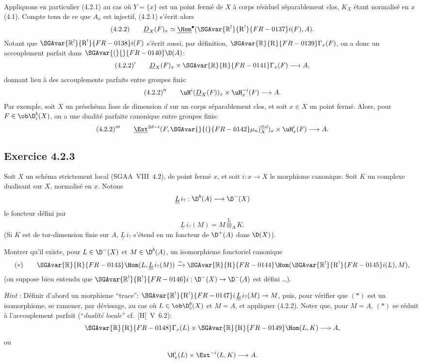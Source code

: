 Appliquons en particulier (4.2.1) au cas où $Y=\{x\}$ est un point fermé de $X$ à corps résiduel séparablement clos, $K_X$ étant normalisé en $x$ (4.1). Compte tenu de ce que $A_x$ est injectif, (4.2.1) s'écrit alors
\[
(4.2.2)\qquad \underline{D}_X(F)_x\simeq\underline{\Hom}^{\bullet}(\SGAvar{\mathbb{R}^{!}}{\mathrm{R}^{!}}{FR-0137}i(F),A).
\]
Notant que $\SGAvar{\mathbb{R}^{!}}{\mathrm{R}^{!}}{FR-0138}i(F)$ s'écrit aussi, par définition, $\SGAvar{\mathbb{R}}{\mathrm{R}}{FR-0139}\Gamma_x(F)$, on a donc un accouplement parfait dans $\SGAvar{(}{}{FR-0140}\D(A)$:
\[
(4.2.2)'\qquad \underline{D}_X(F)_x\times \SGAvar{\mathbb{R}}{\mathrm{R}}{FR-0141}\Gamma_x(F)\longrightarrow A,
\]
donnant lieu à des accouplements parfaits entre groupes finis:
\[
(4.2.2)''\qquad \uH^i(\underline{D}_X(F))_x\times \uH_x^{-i}(F)\longrightarrow A.
\]
Par exemple, soit $X$ un préschéma lisse de dimension $d$ sur un corps séparablement clos, et soit $x\in X$ un point fermé. Alors, pour $F\in\ob\D_c^b(X)$, on a une dualité parfaite canonique entre groupes finis:
\[
(4.2.2)'''\qquad \underline{\Ext}^{2d-i}(F,\SGAvar{}{(}{FR-0142}\mu_n)_X^{\otimes d})_x\times \uH_x^i(F)\longrightarrow A.
\]

\subsection*{Exercice 4.2.3}
Soit $X$ un schéma strictement local (SGAA~VIII~4.2), de point fermé $x$, et soit $i:x\to X$ le morphisme canonique. Soit $K$ un complexe dualisant sur $X$, normalisé en $x$. Notons
\[
\underline{\underline{L}}\, i_? : \D^b(A)\longrightarrow \D^-(X)
\]
le foncteur défini par
\[
\underline{\underline{L}}\, i_?(M)=M\overset{\mathrm{L}}{\otimes}_A K.
\]
(Si $K$ est de tor-dimension finie sur $A$, $\underline{\underline{L}}\, i_?$ s'étend en un foncteur de $\D^+(A)$ dans $\D(X)$).

Montrer qu'il existe, pour $L\in\D^-(X)$ et $M\in\D^b(A)$, un isomorphisme fonctoriel canonique
\[
(*)\qquad \SGAvar{\mathbb{R}}{\mathrm{R}}{FR-0143}\Hom(L,\underline{\underline{L}}\, i_?(M))\xrightarrow{\sim}\SGAvar{\mathbb{R}}{\mathrm{R}}{FR-0144}\Hom(\SGAvar{\mathbb{R}^{!}}{\mathrm{R}^{!}}{FR-0145}i(L),M),
\]
(on suppose bien entendu que $\SGAvar{\mathbb{R}^{!}}{\mathrm{R}^{!}}{FR-0146}i:\D^-(X)\to\D^-(A)$ est défini \dots).

\emph{Hint} : Définir d'abord un morphisme ``trace'': $\SGAvar{\mathbb{R}^{!}}{\mathrm{R}^{!}}{FR-0147}i\,\underline{\underline{L}}\, i_?(M)\to M$, puis, pour vérifier que $(*)$ est un isomorphisme, se ramener, par dévissage, au cas où $L\in\ob\D_c^b(X)$ et $M=A$, et appliquer (4.2.2). Noter que, pour $M=A$, $(*)$ se réduit à l'accouplement parfait (``\emph{dualité locale}'' cf.~[H]~V~6.2):
\[
\SGAvar{\mathbb{R}}{\mathrm{R}}{FR-0148}\Gamma_x(L)\times \SGAvar{\mathbb{R}}{\mathrm{R}}{FR-0149}\Hom(L,K)\longrightarrow A,
\]
ou
\[
\H_x^i(L)\times \Ext^{-i}(L,K)\longrightarrow A.
\]

